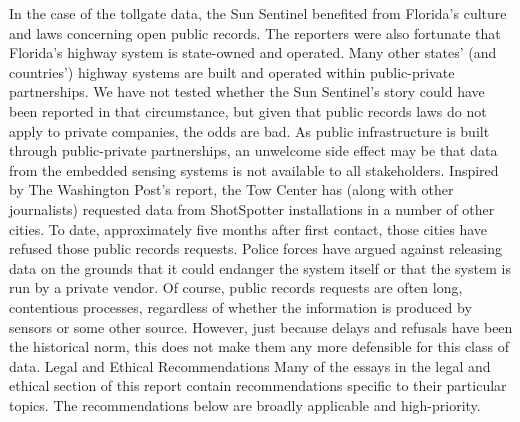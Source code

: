 In the case of the tollgate data, the Sun Sentinel benefited from Florida's
culture and laws concerning open public records. The reporters were also
fortunate that Florida's highway system is state-owned and operated. Many
other states' (and countries') highway systems are built and operated within
public-private partnerships. We have not tested whether the Sun Sentinel's
story could have been reported in that circumstance, but given that public
records laws do not apply to private companies, the odds are bad. As public
infrastructure is built through public-private partnerships, an unwelcome
side effect may be that data from the embedded sensing systems is not available
to all stakeholders.
Inspired by The Washington Post's report, the Tow Center has (along with
other journalists) requested data from ShotSpotter installations in a number
of other cities. To date, approximately five months after first contact, those
cities have refused those public records requests. Police forces have argued
against releasing data on the grounds that it could endanger the system
itself or that the system is run by a private vendor. Of course, public records
requests are often long, contentious processes, regardless of whether the
information is produced by sensors or some other source. However, just
because delays and refusals have been the historical norm, this does not
make them any more defensible for this class of data.
Legal and Ethical Recommendations
Many of the essays in the legal and ethical section of this report contain
recommendations specific to their particular topics. The recommendations
below are broadly applicable and high-priority.

